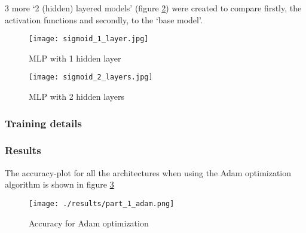 3 more `2 (hidden) layered models' (figure \ref{fig: NN 2l}) were created to compare firstly, the activation
functions and secondly, to the `base model'.


\begin{figure}
    \centering
    \texttt{[image: sigmoid\_1\_layer.jpg]}
    \caption{MLP with 1 hidden layer}
    \label{fig: NN 1l}
\end{figure}

\begin{figure}
    \centering
    \texttt{[image: sigmoid\_2\_layers.jpg]}
    \caption{MLP with 2 hidden layers}
    \label{fig: NN 2l}
\end{figure}

\subsubsection{Training details}


\subsubsection{Results}

The accuracy-plot for all the architectures when using the Adam optimization algorithm is shown 
in figure \ref{fig: Adam results Part 1}

\begin{figure}
    \centering
    \texttt{[image: ./results/part\_1\_adam.png]}
    \caption{Accuracy for Adam optimization}
    \label{fig: Adam results Part 1}
\end{figure}
